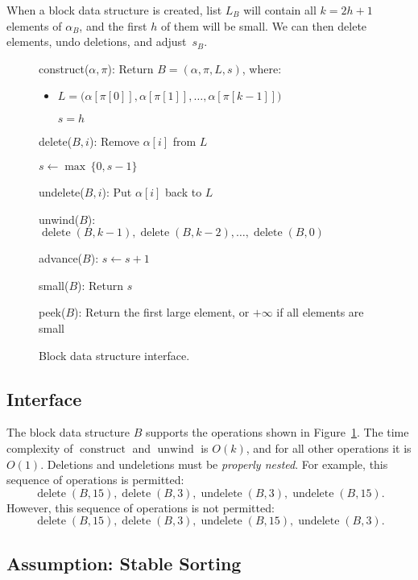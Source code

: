 \documentclass[a4paper,11pt]{article}
\DeclareMathOperator{\Construct}{construct}
\DeclareMathOperator{\Delete}{delete}
\DeclareMathOperator{\Undelete}{undelete}
\DeclareMathOperator{\Unwind}{unwind}
\newcommand{\algorithm}[2]{\begin{framed}\begin{description}[style=nextline,parsep=2pt,itemsep=9pt,#1]#2
\end{description}\vspace{-4mm}\end{framed}\vspace{-4mm}}
\newcommand{\block}[1]{\begin{itemize}[nolistsep,label=,parsep=2pt,topsep=0pt,leftmargin=10mm]\item #1\end{itemize}\vspace{1pt}}
\begin{document}
When a block data structure is created, list $L_B$ will contain all $k=2h+1$ elements of $\alpha_B$, and the first $h$ of them will be small. We can then delete elements, undo deletions, and adjust~$s_B$.

\begin{figure}
\algorithm{leftmargin=33mm,itemsep=6pt}{
\item[construct($\alpha, \pi$):]
    Return $B = (\alpha,\pi,L,s)$, where: \block{
    $L = \bigl(\alpha[\pi[0]], \alpha[\pi[1]], \dotsc, \alpha[\pi[k-1]]\bigr)$
    
    $s = h$
    }

\item[delete($B,i$):]
    Remove $\alpha[i]$ from $L$

    $s \gets \max \, \{0, s-1\}$

\item[undelete($B,i$):]
    Put $\alpha[i]$ back to $L$

\item[unwind($B$):]
    $\Delete(B,k-1), \Delete(B,k-2), \dotsc, \Delete(B,0)$

\item[advance($B$):]
    $s \gets s + 1$

\item[small($B$):]
    Return $s$

\item[peek($B$):]
    Return the first large element, or $+\infty$ if all elements are small
}
 \caption{Block data structure interface.}\label{fig:block-if}
\end{figure}


\subsection{Interface}

The block data structure $B$ supports the operations shown in Figure~\ref{fig:block-if}. The time complexity of $\Construct$ and $\Unwind$ is $O(k)$, and for all other operations it is $O(1)$. Deletions and undeletions must be \emph{properly nested}. For example, this sequence of operations is permitted:
\[
    \Delete(B,15), \Delete(B,3), \Undelete(B,3), \Undelete(B,15).
\]
However, this sequence of operations is not permitted:
\[
    \Delete(B,15), \Delete(B,3), \Undelete(B,15), \Undelete(B,3).
\]

\subsection{Assumption: Stable Sorting}\label{ssec:stable}
\end{document}
